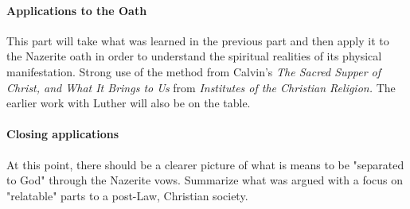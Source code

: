 \documentclass[12pt,a4paper]{article}
\begin{document}
\paragraph{Applications to the Oath} This part will take what was learned in the previous part and then apply it to the Nazerite oath in order to understand the spiritual realities of its physical manifestation. Strong use of the method from Calvin's \textit{The Sacred Supper of Christ, and What It Brings to Us} from \textit{Institutes of the Christian Religion.} The earlier work with Luther will also be on the table.

\paragraph{Closing applications} At this point, there should be a clearer picture of what is means to be "separated to God" through the Nazerite vows. Summarize what was argued with a focus on "relatable" parts to a post-Law, Christian society.
\end{document}
